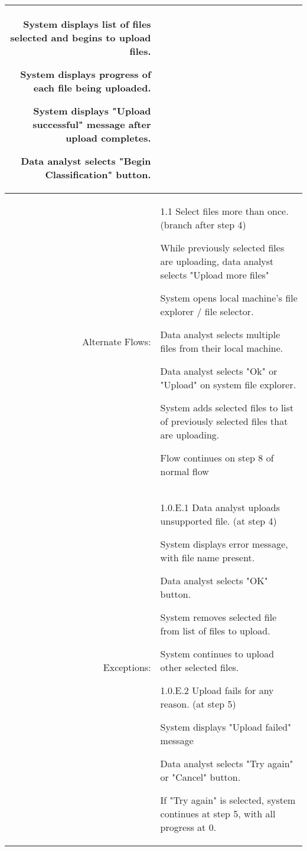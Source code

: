 \documentclass[12pt,oneside,letterpaper]{article}
\newenvironment{packed_enumerate}{ %
\vspace{-7mm}
\begin{enumerate}
  \setlength{\itemsep}{0pt}
  \setlength{\parskip}{0pt}
  \setlength{\parsep}{0pt}
}{\end{enumerate}
\vspace{-8mm}}
\begin{document}
\begin{longtable}{|r|p{3.8in}|}
\begin{packed_enumerate}
\item System displays list of files selected and begins to upload files.
\item System displays progress of each file being uploaded.
\item System displays "Upload successful" message after upload completes.
\item Data analyst selects "Begin Classification" button.
\end{packed_enumerate}\\
\hline
Alternate Flows:&1.1 Select files more than once. (branch after step 4)\newline
\begin{packed_enumerate}
\item While previously selected files are uploading, data analyst selects "Upload more files"
\item System opens local machine's file explorer / file selector.
\item Data analyst selects multiple files from their local machine.
\item Data analyst selects "Ok" or "Upload" on system file explorer.
\item System adds selected files to list of previously selected files that are uploading.
\item Flow continues on step 8 of normal flow
\end{packed_enumerate}\\
\hline
Exceptions:&1.0.E.1 Data analyst uploads unsupported file. (at step 4)\newline
\begin{packed_enumerate}
\item System displays error message, with file name present.
\item Data analyst selects "OK" button.
\item System removes selected file from list of files to upload.
\item System continues to upload other selected files.\newline
\end{packed_enumerate}
1.0.E.2 Upload fails for any reason. (at step 5)\newline
\begin{packed_enumerate}
\item System displays "Upload failed" message
\item Data analyst selects "Try again" or "Cancel" button.
\item If "Try again" is selected, system continues at step 5, with all progress at 0.

\end{packed_enumerate}
\end{longtable}
\end{document}
